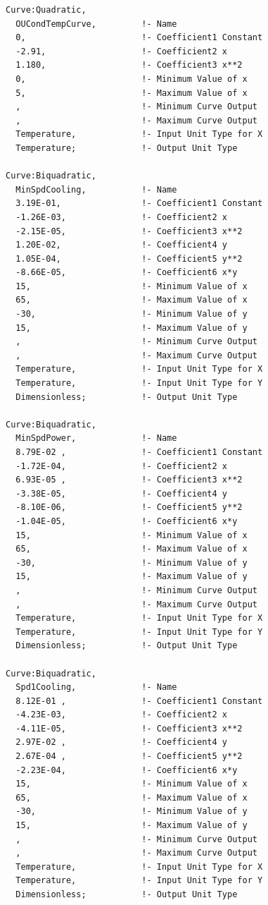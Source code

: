 \begin{lstlisting}
Curve:Quadratic,
  OUCondTempCurve,         !- Name
  0,                       !- Coefficient1 Constant
  -2.91,                   !- Coefficient2 x
  1.180,                   !- Coefficient3 x**2
  0,                       !- Minimum Value of x
  5,                       !- Maximum Value of x
  ,                        !- Minimum Curve Output
  ,                        !- Maximum Curve Output
  Temperature,             !- Input Unit Type for X
  Temperature;             !- Output Unit Type

Curve:Biquadratic,
  MinSpdCooling,           !- Name
  3.19E-01,                !- Coefficient1 Constant
  -1.26E-03,               !- Coefficient2 x
  -2.15E-05,               !- Coefficient3 x**2
  1.20E-02,                !- Coefficient4 y
  1.05E-04,                !- Coefficient5 y**2
  -8.66E-05,               !- Coefficient6 x*y
  15,                      !- Minimum Value of x
  65,                      !- Maximum Value of x
  -30,                     !- Minimum Value of y
  15,                      !- Maximum Value of y
  ,                        !- Minimum Curve Output
  ,                        !- Maximum Curve Output
  Temperature,             !- Input Unit Type for X
  Temperature,             !- Input Unit Type for Y
  Dimensionless;           !- Output Unit Type

Curve:Biquadratic,
  MinSpdPower,             !- Name
  8.79E-02 ,               !- Coefficient1 Constant
  -1.72E-04,               !- Coefficient2 x
  6.93E-05 ,               !- Coefficient3 x**2
  -3.38E-05,               !- Coefficient4 y
  -8.10E-06,               !- Coefficient5 y**2
  -1.04E-05,               !- Coefficient6 x*y
  15,                      !- Minimum Value of x
  65,                      !- Maximum Value of x
  -30,                     !- Minimum Value of y
  15,                      !- Maximum Value of y
  ,                        !- Minimum Curve Output
  ,                        !- Maximum Curve Output
  Temperature,             !- Input Unit Type for X
  Temperature,             !- Input Unit Type for Y
  Dimensionless;           !- Output Unit Type

Curve:Biquadratic,
  Spd1Cooling,             !- Name
  8.12E-01 ,               !- Coefficient1 Constant
  -4.23E-03,               !- Coefficient2 x
  -4.11E-05,               !- Coefficient3 x**2
  2.97E-02 ,               !- Coefficient4 y
  2.67E-04 ,               !- Coefficient5 y**2
  -2.23E-04,               !- Coefficient6 x*y
  15,                      !- Minimum Value of x
  65,                      !- Maximum Value of x
  -30,                     !- Minimum Value of y
  15,                      !- Maximum Value of y
  ,                        !- Minimum Curve Output
  ,                        !- Maximum Curve Output
  Temperature,             !- Input Unit Type for X
  Temperature,             !- Input Unit Type for Y
  Dimensionless;           !- Output Unit Type


\end{lstlisting}
